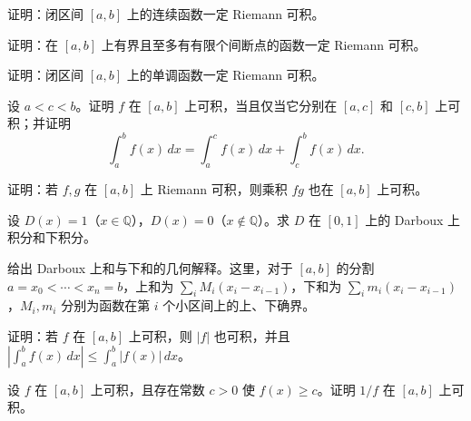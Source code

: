 \noindent\begin{minipage}{\textwidth}
证明：闭区间 $[a,b]$ 上的连续函数一定 Riemann 可积。
\end{minipage}\par\vfill
\noindent\begin{minipage}{\textwidth}
证明：在 $[a,b]$ 上有界且至多有有限个间断点的函数一定 Riemann 可积。
\end{minipage}\par\vfill
\noindent\begin{minipage}{\textwidth}
证明：闭区间 $[a,b]$ 上的单调函数一定 Riemann 可积。
\end{minipage}\par\vfill
\newpage
\noindent\begin{minipage}{\textwidth}
设 $a<c<b$。证明 $f$ 在 $[a,b]$ 上可积，当且仅当它分别在 $[a,c]$ 和 $[c,b]$ 上可积；并证明\[\int_a^b f(x)\,dx=\int_a^c f(x)\,dx+\int_c^b f(x)\,dx.\]
\end{minipage}\par\vfill
\noindent\begin{minipage}{\textwidth}
证明：若 $f,g$ 在 $[a,b]$ 上 Riemann 可积，则乘积 $fg$ 也在 $[a,b]$ 上可积。
\end{minipage}\par\vfill
\noindent\begin{minipage}{\textwidth}
设 $D(x)=1$（$x\in\mathbb Q$），$D(x)=0$（$x\notin\mathbb Q$）。求 $D$ 在 $[0,1]$ 上的 Darboux 上积分和下积分。
\end{minipage}\par\vfill
\noindent\begin{minipage}{\textwidth}
给出 Darboux 上和与下和的几何解释。这里，对于 $[a,b]$ 的分割 $a=x_0<\cdots<x_n=b$，上和为 $\sum_i M_i(x_i-x_{i-1})$，下和为 $\sum_i m_i(x_i-x_{i-1})$，$M_i,m_i$ 分别为函数在第 $i$ 个小区间上的上、下确界。
\end{minipage}\par\vfill
\newpage
\noindent\begin{minipage}{\textwidth}
证明：若 $f$ 在 $[a,b]$ 上可积，则 $|f|$ 也可积，并且 $\left|\int_a^b f(x)\,dx\right|\le\int_a^b|f(x)|\,dx$。
\end{minipage}\par\vfill
\noindent\begin{minipage}{\textwidth}
设 $f$ 在 $[a,b]$ 上可积，且存在常数 $c>0$ 使 $f(x)\ge c$。证明 $1/f$ 在 $[a,b]$ 上可积。
\end{minipage}\par\vfill
